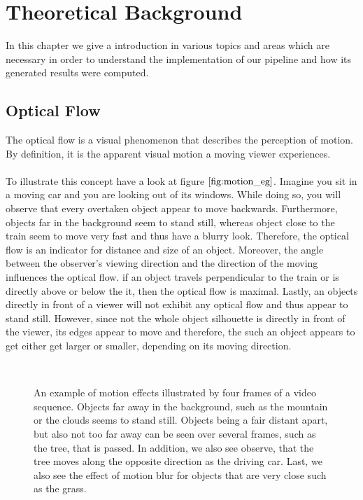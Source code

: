\chapter{Theoretical Background}
In this chapter we give a introduction in various topics and areas which are necessary in order to understand the implementation of our pipeline and how its generated results were computed. 

\section{Optical Flow}
The optical flow is a visual phenomenon that describes the perception of motion.
By definition, it is the apparent visual motion a moving viewer experiences. \\ \\
To illustrate this concept have a look at figure $\ref{fig:motion_eg}$. Imagine you sit in a moving car and you are looking out of its windows. While doing so, you will observe that every overtaken object appear to move backwards. Furthermore, objects far in the background seem to stand still, whereas object close to the train seem to move very fast and thus have a blurry look. Therefore, the optical flow is an indicator for distance and size of an object. Moreover, the angle between the observer's viewing direction and the direction of the moving influences the optical flow. if an object travels perpendicular to the train or is directly above or below the it, then the optical flow is maximal. Lastly, an objects directly in front of a viewer will not exhibit any optical flow and thus appear to stand still. However, since not the whole object silhouette is directly in front of the viewer, its edges appear to move and therefore, the such an object appears to get either get larger or smaller, depending on its moving direction.

\begin{figure}[H]
\begin{center}
~
\end{center}
\caption{An example of motion effects illustrated by four frames of a video sequence. Objects far away in the background, such as the mountain or the clouds seems to stand still. Objects being a fair distant apart, but also not too far away can be seen over several frames, such as the tree, that is passed. In addition, we also see observe, that the tree moves along the opposite direction as the driving car. Last, we also see the effect of motion blur for objects that are very close such as the grass.}
\label{fig:motion_eg}
\end{figure}


